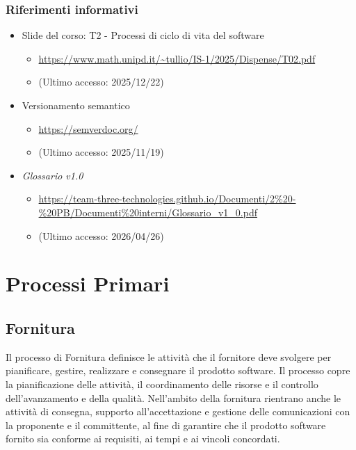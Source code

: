 \documentclass[a4paper,12pt]{article}
\begin{document}
        \subsubsection{Riferimenti informativi}
            \label{sec:refinf}
            \begin{itemize}
                \item Slide del corso: T2 - Processi di ciclo di vita del software
                \begin{itemize}
                    \item \url{https://www.math.unipd.it/~tullio/IS-1/2025/Dispense/T02.pdf} 
                    \item[] (Ultimo accesso: 2025/12/22)
                \end{itemize}
                \item Versionamento semantico
                \begin{itemize}
                    \item \url{https://semverdoc.org/}
                    \item[] (Ultimo accesso: 2025/11/19)
                \end{itemize}
                \item \textit{Glossario v1.0}
                \begin{itemize}
                    \item \url{https://team-three-technologies.github.io/Documenti/2%20-%20PB/Documenti%20interni/Glossario_v1_0.pdf}
                    \item[] (Ultimo accesso: 2026/04/26)
                \end{itemize}
            \end{itemize}
            
\newpage

\section{Processi Primari}
    \subsection{Fornitura}
        Il processo di Fornitura definisce le attività che il fornitore deve svolgere per pianificare, gestire, realizzare e consegnare il prodotto software.
        Il processo copre la pianificazione delle attività, il coordinamento delle risorse e il controllo dell'avanzamento e della qualità.
        Nell'ambito della fornitura rientrano anche le attività di consegna, supporto all'accettazione e gestione delle comunicazioni con la proponente e il committente, al fine di garantire che il prodotto software fornito sia conforme ai requisiti, ai tempi e ai vincoli concordati.
        
\end{document}
